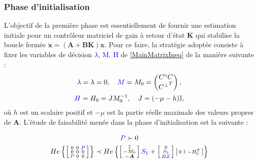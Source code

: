 \subsubsection{Phase d'initialisation} 
L'objectif de la première phase est essentiellement de fournir une estimation initiale pour un contrôleur matriciel de gain à retour d'état $\boldsymbol{K}$ qui stabilise la boucle fermée $\dot{\boldsymbol{x}}=(\boldsymbol{A}+\boldsymbol{B}\boldsymbol{K})\boldsymbol{x}$. Pour ce faire, la stratégie adoptée consiste à fixer les variables de décision \textcolor{blue}{$\lambda$, M, H} de \eqref{MainMatrixIneq} de la manière suivante :
\begin{equation}
    \begin{gathered}
        \textcolor{blue}{\lambda} = \lambda = 0, \quad
        \textcolor{blue}{M} = M_0 = \begin{pmatrix}
            C^{\circ}C\\
            {C^{\perp}}^T
        \end{pmatrix},\\
        \textcolor{blue}{H} = H_0 = J M_0^{-1}, \quad
        J = (-\mu-h)\mathbb{I},
    \end{gathered}
    \label{InitVariableFixing}
\end{equation} 
où $h$ est un scalaire positif et $-\mu$ est la partie réelle maximale des valeurs propres de $\boldsymbol{A}$. L'étude de faisabilité menée dans la phase d'initialisation est la suivante :

\begin{equation}
    \begin{gathered}
        \textcolor{blue}{P} \succ 0 \\
        He\left\{ \left[ \begin{smallmatrix}
            0 & 0 & \textcolor{blue}{P}\\
            0 & 0 & 0\\
            \textcolor{blue}{P} & 0 & 0
        \end{smallmatrix} \right]\right\}
    \prec
    He\left\{\left[ \begin{smallmatrix}
        \mathbb{I}\\
            -M_0 \\
            -\boldsymbol{A}
    \end{smallmatrix} \right]
    \textcolor{blue}{S_1} +
    \left[ \begin{smallmatrix}
        0\\
        \textcolor{blue}{S_2}\\
        B\textcolor{blue}{Z}
     \end{smallmatrix} \right]
    \left[ \begin{smallmatrix}
        0 & \mathbb{I} & -H_0^T
     \end{smallmatrix} \right]\right\}
    \end{gathered}
    \label{InitMatrixIneq} 
\end{equation} 

